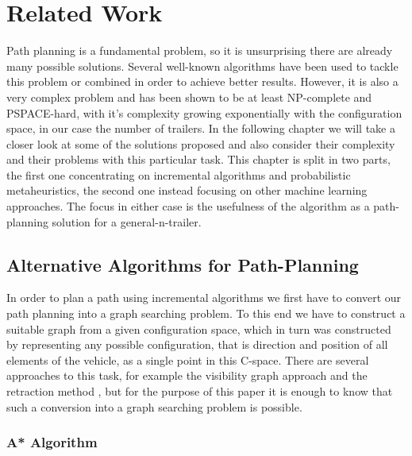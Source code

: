 \chapter{Related Work}
\label{cha:related_work}

Path planning is a fundamental problem, so it is unsurprising there are already many possible solutions. Several well-known algorithms have been used to tackle this problem or combined in order to achieve better results. However, it is also a very complex problem and has been shown to be at least NP-complete and PSPACE-hard, with it's complexity growing exponentially with the configuration space, in our case the number of trailers. \cite{1} In the following chapter we will take a closer look at some of the solutions proposed and also consider their complexity and their problems with this particular task. This chapter is split in two parts, the first one concentrating on incremental algorithms and probabilistic metaheuristics, the second one instead focusing on other machine learning approaches. The focus in either case is the usefulness of the algorithm as a path-planning solution for a general-n-trailer. \pagebreak[4]

\section{Alternative Algorithms for Path-Planning}
\label{sec:alternative_pathplanning}

In order to plan a path using incremental algorithms we first have to convert our path planning into a graph searching problem. To this end we have to construct a suitable graph from a given configuration space, which in turn was constructed by representing any possible configuration, that is direction and position of all elements of the vehicle, as a single point in this C-space. There are several approaches to this task, for example the visibility graph approach \cite{2,3} and the retraction method \cite{4,5}, but for the purpose of this paper it is enough to know that such a conversion into a graph searching problem is possible. 

\subsection{A* Algorithm}
\label{sec:a_star}

